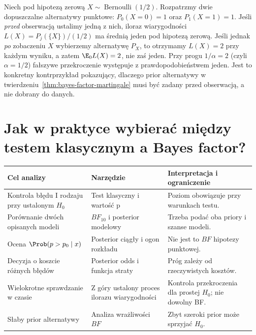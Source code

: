 \begin{przyklad}
\label{ex:adapt-bf-fails}
Niech pod hipotezą zerową $X\sim\operatorname{Bernoulli}(1/2)$.
Rozpatrzmy dwie dopuszczalne alternatywy punktowe:
$P_0(X=0)=1$ oraz $P_1(X=1)=1$. Jeśli \emph{przed}
obserwacją ustalimy jedną z nich, iloraz wiarygodności
$L(X)=P_j(\{X\})/(1/2)$ ma średnią jeden pod hipotezą
zerową. Jeśli jednak \emph{po} zobaczeniu $X$ wybierzemy
alternatywę $P_X$, to otrzymamy $L(X)=2$ przy każdym wyniku,
a zatem $\E_0 L(X)=2$, nie zaś jeden.
Przy progu $1/\alpha=2$ (czyli $\alpha=1/2$) fałszywe
przekroczenie występuje z prawdopodobieństwem jeden.
Jest to konkretny kontrprzykład pokazujący, dlaczego prior
alternatywy w twierdzeniu~\ref{thm:bayes-factor-martingale}
musi być zadany przed obserwacją, a nie dobrany do danych.
\end{przyklad}

\section{Jak w praktyce wybierać między testem klasycznym a Bayes factor?}
\begin{center}\small
\begin{tabular}{>{\raggedright\arraybackslash}p{}>{\raggedright\arraybackslash}p{}>{\raggedright\arraybackslash}p{}}
\toprule
\textbf{Cel analizy} & \textbf{Narzędzie} & \textbf{Interpretacja i ograniczenie}\\
\midrule
Kontrola błędu I rodzaju przy ustalonym $H_0$ & Test klasyczny i wartość p & Poziom obowiązuje przy warunkach testu.\\
Porównanie dwóch opisanych modeli & $BF_{10}$ i posterior modelowy & Trzeba podać oba priory i szanse modeli.\\
Ocena $\Prob(p>p_0\mid x)$ & Posterior ciągły i ogon rozkładu & Nie jest to $BF$ hipotezy punktowej.\\
Decyzja o koszcie różnych błędów & Posterior odds i funkcja straty & Próg zależy od rzeczywistych kosztów.\\
Wielokrotne sprawdzanie w czasie & Z góry ustalony proces ilorazu wiarygodności & Kontrola przekroczenia dla prostej $H_0$; nie dowolny BF.\\
Słaby prior alternatywy & Analiza wrażliwości $BF$ & Zbyt szeroki prior może sprzyjać $H_0$.\\
\bottomrule
\end{tabular}
\end{center}

